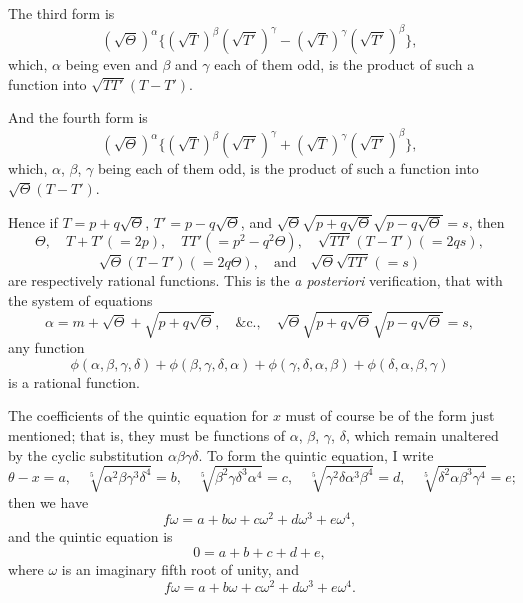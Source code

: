 \documentclass[11pt,a4paper]{article}
\theoremstyle{plain}
\begin{document}
The third form is
\[
(\sqrt{\Theta})^\alpha \{(\sqrt{T})^\beta (\sqrt{T'})^\gamma - (\sqrt{T})^\gamma (\sqrt{T'})^\beta\},
\]
which, $\alpha$ being even and $\beta$ and $\gamma$ each of them odd, is the product of such a function into $\sqrt{TT'}(T-T')$.

And the fourth form is
\[
(\sqrt{\Theta})^\alpha \{(\sqrt{T})^\beta (\sqrt{T'})^\gamma + (\sqrt{T})^\gamma (\sqrt{T'})^\beta\},
\]
which, $\alpha$, $\beta$, $\gamma$ being each of them odd, is the product of such a function into $\sqrt{\Theta}(T-T')$.

Hence if $T = p + q\sqrt{\Theta}$, $T' = p - q\sqrt{\Theta}$, and $\sqrt{\Theta}\sqrt{p+q\sqrt{\Theta}}\sqrt{p-q\sqrt{\Theta}} = s$, then
\[
\Theta, \quad T+T' (= 2p), \quad TT' (= p^2 - q^2\Theta), \quad \sqrt{TT'}(T-T') (= 2qs),
\]
\[
\sqrt{\Theta}(T-T') (= 2q\Theta), \quad \text{and} \quad \sqrt{\Theta}\sqrt{TT'} (= s)
\]
are respectively rational functions. This is the \textit{a posteriori} verification, that with the system of equations
\[
\alpha = m + \sqrt{\Theta} + \sqrt{p+q\sqrt{\Theta}}, \quad \&\text{c.}, \quad \sqrt{\Theta}\sqrt{p+q\sqrt{\Theta}}\sqrt{p-q\sqrt{\Theta}} = s,
\]
any function
\[
\phi(\alpha, \beta, \gamma, \delta) + \phi(\beta, \gamma, \delta, \alpha) + \phi(\gamma, \delta, \alpha, \beta) + \phi(\delta, \alpha, \beta, \gamma)
\]
is a rational function.

\newpage
The coefficients of the quintic equation for $x$ must of course be of the form just mentioned; that is, they must be functions of $\alpha$, $\beta$, $\gamma$, $\delta$, which remain unaltered by the cyclic substitution $\alpha\beta\gamma\delta$. To form the quintic equation, I write
\[
\theta - x = a, \quad \sqrt[5]{\alpha^2\beta\gamma^3\delta^4} = b, \quad \sqrt[5]{\beta^2\gamma\delta^3\alpha^4} = c, \quad \sqrt[5]{\gamma^2\delta\alpha^3\beta^4} = d, \quad \sqrt[5]{\delta^2\alpha\beta^3\gamma^4} = e;
\]
then we have
\[
f\omega = a + b\omega + c\omega^2 + d\omega^3 + e\omega^4,
\]
and the quintic equation is
\[
0 = a + b + c + d + e,
\]
where $\omega$ is an imaginary fifth root of unity, and
\[
f\omega = a + b\omega + c\omega^2 + d\omega^3 + e\omega^4.
\]
\end{document}
